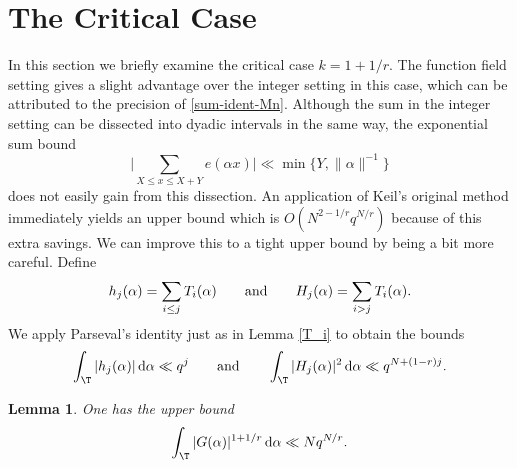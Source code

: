 \documentclass[reqno,11pt]{amsart}
\newtheorem{lemma}[theorem]{Lemma}
\theoremstyle{definition}
\theoremstyle{remark}
\numberwithin{equation}{section}
\renewcommand{\d}{\,{\rm d}} %
\newcommand{\<}{\begin{equation}}
\renewcommand{\>}{\end{equation}}
\begin{document}
\section{The Critical Case}

In this section we briefly examine the critical case $k=1+1/r$. The function field setting gives a slight advantage over the integer setting in this case, which can be attributed to the precision of \eqref{sum-ident-Mn}. Although the sum in the integer setting can be dissected into dyadic intervals in the same way, the exponential sum bound
\[\bigg|\sum_{X \leq x \leq X+Y} e(\alpha x)\bigg| \ll \min\{Y,\|\alpha\|^{-1}\}\]
does not easily gain from this dissection. An application of Keil's original method immediately yields an upper bound which is $O(N^{2-1/r}q^{N/r})$ because of this extra savings. We can improve this to a tight upper bound by being a bit more careful. Define 
\[h_j(\alpha) = \sum_{i \leq j} T_i(\alpha) \qquad {\rm and } \qquad H_j(\alpha) = \sum_{i>j} T_i(\alpha).\]
We apply Parseval's identity just as in Lemma \ref{T_i} to obtain the bounds
\<\label{h_j-bounds}
\int_\T |h_j(\alpha)|\d\alpha \ll q^j \qquad {\rm and } \qquad \int_\T |H_j(\alpha)|^2 \d\alpha \ll q^{N+(1-r)j}.
\>
\begin{lemma}\label{crit-upper}
    One has the upper bound
    \[\int_\T |G(\alpha)|^{1+1/r} \d\alpha \ll Nq^{N/r}.\]
\end{lemma}
\end{document}
